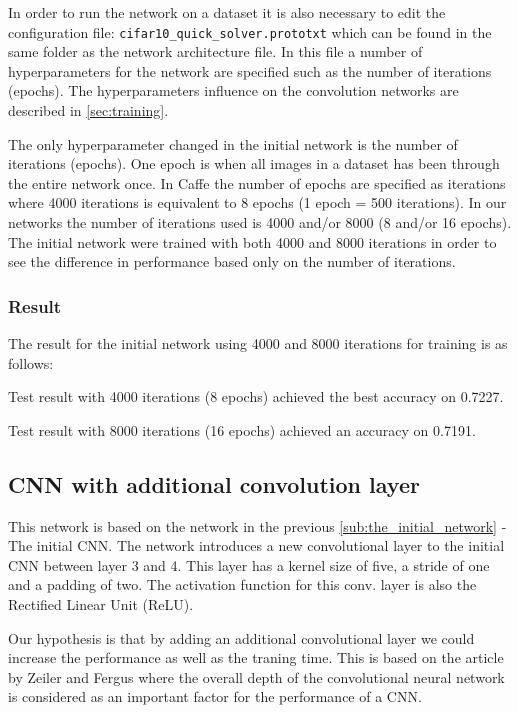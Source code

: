 In order to run the network on a dataset it is also necessary to edit the
configuration file: \verb|cifar10_quick_solver.prototxt| which can be found in
the same folder as the network architecture file. In this file a number of
hyperparameters for the network are specified such as the number of iterations
(epochs). The hyperparameters influence on the convolution networks are
described in \autoref{sec:training}.


The only hyperparameter changed in the initial network is the number of
iterations (epochs). One epoch is when all images in a dataset has
been through the entire network once. In Caffe the number of epochs are
specified as iterations where 4000 iterations is equivalent to 8 epochs (1
epoch = 500 iterations).
In our networks the number of iterations used is 4000 and/or 8000 (8 and/or 16
epochs). The initial network were trained with both 4000 and 8000 iterations in
order to see the difference in performance based only on the number of
iterations.


\subsubsection{Result}

The result for the initial network using 4000 and 8000 iterations for training
is as follows: 

Test result with 4000 iterations (8 epochs) achieved the best accuracy on
0.7227.

Test result with 8000 iterations (16 epochs) achieved an accuracy on 0.7191. 



\subsection{CNN with additional convolution layer} %
\label{sub:cnn}

This network is based on the network in the previous
\autoref{sub:the_initial_network} - The initial CNN. The network introduces a
new convolutional layer to the initial CNN between layer 3 and 4. This layer has
a kernel size of five, a stride of one and a padding of two.
The activation function for this conv. layer is also the Rectified Linear Unit
(ReLU). 

Our hypothesis is that by adding an additional convolutional layer we could
increase the performance as well as the traning time. This is based on the
article by Zeiler and Fergus\cite{ZeilerFergus} where the overall depth of the
convolutional neural network is considered as an important factor for the
performance of a CNN.


